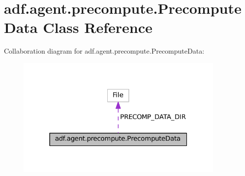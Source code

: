 \hypertarget{classadf_1_1agent_1_1precompute_1_1PrecomputeData}{}\section{adf.\+agent.\+precompute.\+Precompute\+Data Class Reference}
\label{classadf_1_1agent_1_1precompute_1_1PrecomputeData}


Collaboration diagram for adf.\+agent.\+precompute.\+Precompute\+Data\+:
\nopagebreak
\begin{figure}[H]
\begin{center}
\leavevmode
\includegraphics[width=289pt]{classadf_1_1agent_1_1precompute_1_1PrecomputeData__coll__graph}
\end{center}
\end{figure}
